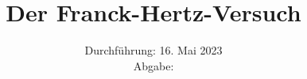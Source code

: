 

\subject{\texorpdfstring{\vspace{2ex}}{}V601\texorpdfstring{\vspace{-2ex}}{}} %
\title{Der Franck-Hertz-Versuch} %
\date{
	Durchführung: 16. Mai 2023 %
	\\ Abgabe:%
}




\maketitle
\thispagestyle{empty}


\tableofcontents
\newpage







\printbibliography{}

\newpage



